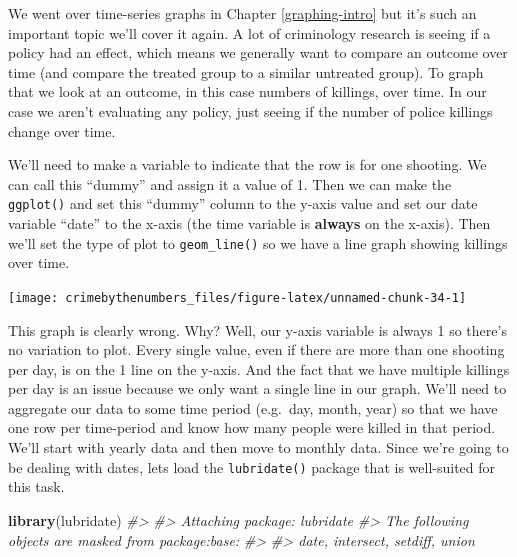 \documentclass[
  12pt,
]{book}
\newenvironment{Shaded}{\begin{snugshade}}{\end{snugshade}}
\newcommand{\CommentTok}[1]{\textcolor[rgb]{0.37,0.37,0.37}{\textit{#1}}}
\newcommand{\DataTypeTok}[1]{\textcolor[rgb]{0.27,0.27,0.27}{#1}}
\newcommand{\DecValTok}[1]{\textcolor[rgb]{0.06,0.06,0.06}{#1}}
\newcommand{\KeywordTok}[1]{\textcolor[rgb]{0.27,0.27,0.27}{\textbf{#1}}}
\newcommand{\NormalTok}[1]{#1}
\newcommand{\OperatorTok}[1]{\textcolor[rgb]{0.43,0.43,0.43}{\textbf{#1}}}
\newcommand{\StringTok}[1]{\textcolor[rgb]{0.5,0.5,0.5}{#1}}
\begin{document}
We went over time-series graphs in Chapter \ref{graphing-intro} but it's such an important topic we'll cover it again. A lot of criminology research is seeing if a policy had an effect, which means we generally want to compare an outcome over time (and compare the treated group to a similar untreated group). To graph that we look at an outcome, in this case numbers of killings, over time. In our case we aren't evaluating any policy, just seeing if the number of police killings change over time.

We'll need to make a variable to indicate that the row is for one shooting. We can call this ``dummy'' and assign it a value of 1. Then we can make the \texttt{ggplot()} and set this ``dummy'' column to the y-axis value and set our date variable ``date'' to the x-axis (the time variable is \textbf{always} on the x-axis). Then we'll set the type of plot to \texttt{geom\_line()} so we have a line graph showing killings over time.

\begin{Shaded}
\end{Shaded}

\begin{center}\texttt{[image: crimebythenumbers\_files/figure-latex/unnamed-chunk-34-1]} \end{center}

This graph is clearly wrong. Why? Well, our y-axis variable is always 1 so there's no variation to plot. Every single value, even if there are more than one shooting per day, is on the 1 line on the y-axis. And the fact that we have multiple killings per day is an issue because we only want a single line in our graph. We'll need to aggregate our data to some time period (e.g.~day, month, year) so that we have one row per time-period and know how many people were killed in that period. We'll start with yearly data and then move to monthly data. Since we're going to be dealing with dates, lets load the \texttt{lubridate()} package that is well-suited for this task.

\begin{Shaded}
\begin{Highlighting}[]
\KeywordTok{library}\NormalTok{(lubridate)}
\CommentTok{\#> }
\CommentTok{\#> Attaching package: \textquotesingle{}lubridate\textquotesingle{}}
\CommentTok{\#> The following objects are masked from \textquotesingle{}package:base\textquotesingle{}:}
\CommentTok{\#> }
\CommentTok{\#>     date, intersect, setdiff, union}
\end{Highlighting}
\end{Shaded}
\end{document}
